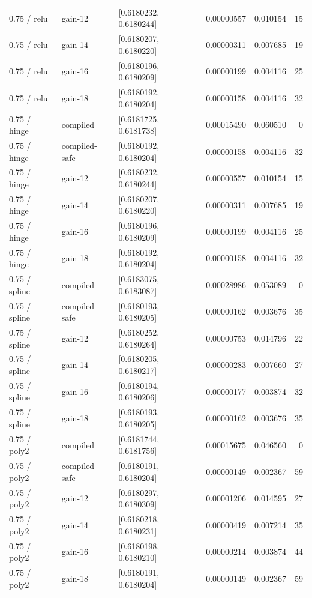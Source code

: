 \begin{longtable}{@{}lllrrr@{}}
0.75 / relu & gain-12 & [0.6180232, 0.6180244] & 0.00000557 & 0.010154 & 15\\
0.75 / relu & gain-14 & [0.6180207, 0.6180220] & 0.00000311 & 0.007685 & 19\\
0.75 / relu & gain-16 & [0.6180196, 0.6180209] & 0.00000199 & 0.004116 & 25\\
0.75 / relu & gain-18 & [0.6180192, 0.6180204] & 0.00000158 & 0.004116 & 32\\
0.75 / hinge & compiled & [0.6181725, 0.6181738] & 0.00015490 & 0.060510 & 0\\
0.75 / hinge & compiled-safe & [0.6180192, 0.6180204] & 0.00000158 & 0.004116 & 32\\
0.75 / hinge & gain-12 & [0.6180232, 0.6180244] & 0.00000557 & 0.010154 & 15\\
0.75 / hinge & gain-14 & [0.6180207, 0.6180220] & 0.00000311 & 0.007685 & 19\\
0.75 / hinge & gain-16 & [0.6180196, 0.6180209] & 0.00000199 & 0.004116 & 25\\
0.75 / hinge & gain-18 & [0.6180192, 0.6180204] & 0.00000158 & 0.004116 & 32\\
0.75 / spline & compiled & [0.6183075, 0.6183087] & 0.00028986 & 0.053089 & 0\\
0.75 / spline & compiled-safe & [0.6180193, 0.6180205] & 0.00000162 & 0.003676 & 35\\
0.75 / spline & gain-12 & [0.6180252, 0.6180264] & 0.00000753 & 0.014796 & 22\\
0.75 / spline & gain-14 & [0.6180205, 0.6180217] & 0.00000283 & 0.007660 & 27\\
0.75 / spline & gain-16 & [0.6180194, 0.6180206] & 0.00000177 & 0.003874 & 32\\
0.75 / spline & gain-18 & [0.6180193, 0.6180205] & 0.00000162 & 0.003676 & 35\\
0.75 / poly2 & compiled & [0.6181744, 0.6181756] & 0.00015675 & 0.046560 & 0\\
0.75 / poly2 & compiled-safe & [0.6180191, 0.6180204] & 0.00000149 & 0.002367 & 59\\
0.75 / poly2 & gain-12 & [0.6180297, 0.6180309] & 0.00001206 & 0.014595 & 27\\
0.75 / poly2 & gain-14 & [0.6180218, 0.6180231] & 0.00000419 & 0.007214 & 35\\
0.75 / poly2 & gain-16 & [0.6180198, 0.6180210] & 0.00000214 & 0.003874 & 44\\
0.75 / poly2 & gain-18 & [0.6180191, 0.6180204] & 0.00000149 & 0.002367 & 59\\

\end{longtable}
